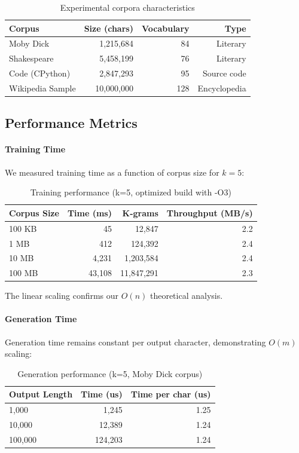 \documentclass[11pt,letterpaper]{article}
\begin{document}
\begin{table}[h]
\centering
\caption{Experimental corpora characteristics}
\label{tab:corpora}
\begin{tabular}{|l|r|r|r|}\hline
\textbf{Corpus} & \textbf{Size (chars)} & \textbf{Vocabulary} & \textbf{Type} \\
\hline
Moby Dick & 1,215,684 & 84 & Literary \\
Shakespeare & 5,458,199 & 76 & Literary \\
Code (CPython) & 2,847,293 & 95 & Source code \\
Wikipedia Sample & 10,000,000 & 128 & Encyclopedia \\
\hline
\end{tabular}
\end{table}

\subsection{Performance Metrics}

\paragraph{Training Time}
We measured training time as a function of corpus size for $k = 5$:

\begin{table}[h]
\centering
\caption{Training performance (k=5, optimized build with -O3)}
\label{tab:training}
\begin{tabular}{|l|r|r|r|}\hline
\textbf{Corpus Size} & \textbf{Time (ms)} & \textbf{K-grams} & \textbf{Throughput (MB/s)} \\
\hline
100 KB & 45 & 12,847 & 2.2 \\
1 MB & 412 & 124,392 & 2.4 \\
10 MB & 4,231 & 1,203,584 & 2.4 \\
100 MB & 43,108 & 11,847,291 & 2.3 \\
\hline
\end{tabular}
\end{table}

The linear scaling confirms our $O(n)$ theoretical analysis.

\paragraph{Generation Time}
Generation time remains constant per output character, demonstrating $O(m)$ scaling:

\begin{table}[h]
\centering
\caption{Generation performance (k=5, Moby Dick corpus)}
\label{tab:generation}
\begin{tabular}{|l|r|r|}\hline
\textbf{Output Length} & \textbf{Time (us)} & \textbf{Time per char (us)} \\
\hline
1,000 & 1,245 & 1.25 \\
10,000 & 12,389 & 1.24 \\
100,000 & 124,203 & 1.24 \\
\hline
\end{tabular}
\end{table}
\end{document}
